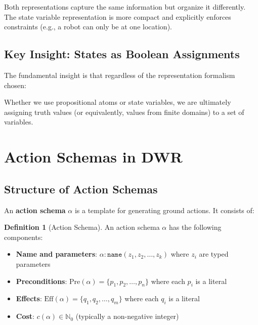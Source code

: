 \documentclass[11pt,a4paper]{article}
\theoremstyle{definition}
\newtheorem{definition}{Definition}[section]
\theoremstyle{plain}
\theoremstyle{remark}
\begin{document}
Both representations capture the same information but organize it differently. The state variable representation is more compact and explicitly enforces constraints (e.g., a robot can only be at one location).

\subsection{Key Insight: States as Boolean Assignments}

The fundamental insight is that regardless of the representation formalism chosen:

\begin{center}
\end{center}

Whether we use propositional atoms or state variables, we are ultimately assigning truth values (or equivalently, values from finite domains) to a set of variables.

\section{Action Schemas in DWR}

\subsection{Structure of Action Schemas}

An \textbf{action schema} $\alpha$ is a template for generating ground actions. It consists of:

\begin{tcolorbox}[colback=green!5!white,colframe=green!75!black,title=\textbf{Action Schema Components}]
\begin{definition}[Action Schema]
An action schema $\alpha$ has the following components:
\begin{itemize}
    \item \textbf{Name and parameters}: $\alpha: \texttt{name}(z_1, z_2, \dots, z_k)$ where $z_i$ are typed parameters
    \item \textbf{Preconditions}: $\text{Pre}(\alpha) = \{p_1, p_2, \dots, p_n\}$ where each $p_i$ is a literal
    \item \textbf{Effects}: $\text{Eff}(\alpha) = \{q_1, q_2, \dots, q_m\}$ where each $q_i$ is a literal
    \item \textbf{Cost}: $c(\alpha) \in \mathbb{N}_0$ (typically a non-negative integer)
\end{itemize}
\end{definition}
\end{tcolorbox}
\end{document}
